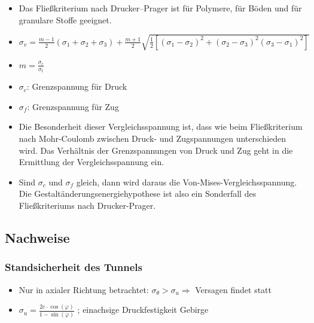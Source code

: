 \documentclass[fleqn,twoside]{article}
\begin{document}
    \begin{itemize}
        \item Das Fließkriterium nach Drucker–Prager ist für Polymere, für Böden und für granulare Stoffe geeignet.
        \item $\sigma_v = \frac{m-1}{2}(\sigma_1 + \sigma_2 + \sigma_3) + \frac{m+1}{2} \sqrt{\frac{1}{2} \left[ (\sigma_1 - \sigma_2)^2 + (\sigma_2 - \sigma_3)^2 (\sigma_3 - \sigma_1)^2 \right] }$
        \item $m = \frac{\sigma_c}{\sigma_t}$
        \item $\sigma_c$: Grenzspannung für Druck
        \item $\sigma_f$: Grenzspannung für Zug
        \item Die Besonderheit dieser Vergleichsspannung ist, dass wie beim Fließkriterium nach Mohr-Coulomb zwischen Druck- und Zugspannungen unterschieden wird. Das Verhältnis der Grenzspannungen von Druck und Zug geht in die Ermittlung der Vergleichsspannung ein.
        \item Sind $\sigma_c$ und $\sigma_f$ gleich, dann wird daraus die Von-Mises-Vergleichsspannung. Die Gestaltänderungsenergiehypothese ist also ein Sonderfall des Fließkriteriums nach Drucker-Prager.
    \end{itemize}
  
  
\subsection{Nachweise}

\subsubsection{Standsicherheit des Tunnels}
\begin{itemize}
    \item Nur in axialer Richtung betrachtet: $\sigma_\theta > \sigma_u \Rightarrow$ Versagen findet statt
    \item $\sigma_u = \frac{2c \cdot \cos(\varphi)}{1-\sin(\varphi)}$ ; einachsige Druckfestigkeit Gebirge
\end{itemize}
\end{document}
